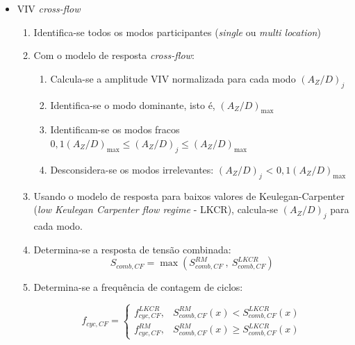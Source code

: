 \begin{itemize}

\item VIV \textit{cross-flow}\label{procedure_il}

\begin{enumerate}
\item Identifica-se todos os modos participantes (\textit{single} ou \textit{multi location})

\item Com o modelo de resposta \textit{cross-flow}:
	\begin{enumerate}
    \item Calcula-se a amplitude VIV normalizada para cada modo ${(A_Z/D)}_j$

	\item Identifica-se o modo dominante, isto é, ${(A_Z/D)}_{\max}$

    \item Identificam-se os modos fracos $0,1{(A_Z/D)}_{\max} \leq {(A_Z/D)}_j \leq {(A_Z/D)}_{\max}$

    \item Desconsidera-se os modos irrelevantes: ${(A_Z/D)}_j$ < $0,1{(A_Z/D)}_{\max}$
    \end{enumerate}

\item Usando o modelo de resposta para baixos valores de Keulegan-Carpenter (\textit{low Keulegan Carpenter flow regime} - LKCR), calcula-se ${(A_Z/D)}_j$ para cada modo.

\item Determina-se a resposta de tensão combinada:
    $$
    S_{\mathit{comb}, \mathit{CF}} = \max\left( S_{\mathit{comb}, \mathit{CF}}^\mathit{RM} ~,~ S_{\mathit{comb}, \mathit{CF}}^\mathit{LKCR} \right)
    $$

\item Determina-se a frequência de contagem de ciclos:

    $$
    f_{\mathit{cyc}, \mathit{CF}} =
    \begin{cases}
    f_{\mathit{cyc}, \mathit{CF}}^\mathit{LKCR}, & S_{\mathit{comb},\mathit{CF}}^\mathit{RM}(x)    < S_{\mathit{comb},\mathit{CF}}^\mathit{LKCR}(x) \\
    f_{\mathit{cyc}, \mathit{CF}}^\mathit{RM},   & S_{\mathit{comb},\mathit{CF}}^\mathit{RM}(x) \geq S_{\mathit{comb},\mathit{CF}}^\mathit{LKCR}(x)
    \end{cases}
    $$

\end{enumerate}


\end{itemize}
